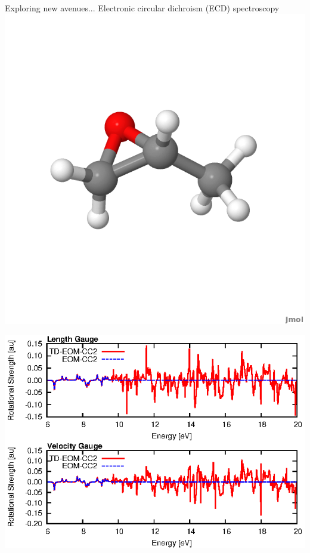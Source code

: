 \documentclass{beamer}
\begin{document}
\begin{frame}{Exploring new avenues...}
Electronic circular dichroism (ECD) spectroscopy \hspace{15pt}
\includegraphics[scale=0.1,trim={1.4in 2.5in 1.4in 1.6in},clip]{figures/methyloxirane.png}
\begin{center}
  \includegraphics[scale=1.0]{figures/methyloxirane_adz.eps}
\end{center}
\end{frame}
\end{document}
